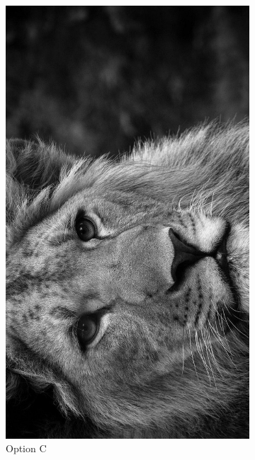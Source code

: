 \documentclass{ximera}
\begin{document}
\begin{problem}
  \begin{figure}[h]
    \centering
    \begin{subfigure}[b]{0.35\textwidth}
      \centering
      \includegraphics[width=\textwidth]{test_image_rot_1.jpg}
      \caption{Option C}
      \label{fig:optionC}
    \end{subfigure}
    \hfill
    \begin{subfigure}[b]{0.35\textwidth}
      \centering

\end{subfigure}
\end{figure}
\end{problem}
\end{document}
